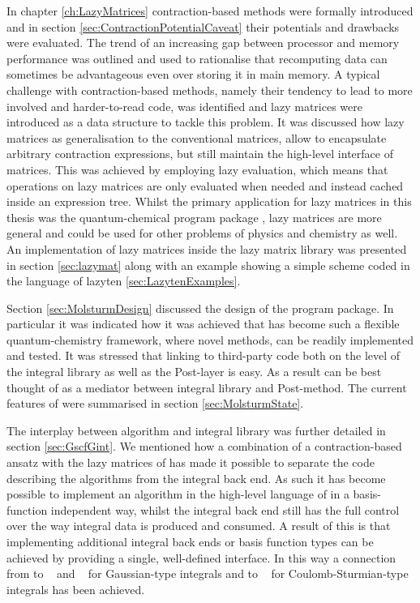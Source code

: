 In chapter \ref{ch:LazyMatrices} contraction-based methods
were formally introduced and in section \ref{sec:ContractionPotentialCaveat}
their potentials and drawbacks were evaluated.
The trend of an increasing gap between processor and memory performance
was outlined and used to rationalise that recomputing data
can sometimes be advantageous even over storing it in main memory.
A typical challenge with contraction-based methods,
namely their tendency to lead to more involved and harder-to-read code,
was identified
and lazy matrices were introduced as a data structure
to tackle this problem.
It was discussed how lazy matrices as generalisation
to the conventional matrices,
allow to encapsulate arbitrary contraction expressions,
but still maintain the high-level interface of matrices.
This was achieved by employing lazy evaluation,
which means that operations on lazy matrices are only
evaluated when needed
and instead cached inside an expression tree.
Whilst the primary application for lazy matrices in this thesis was the quantum-chemical
program package \molsturm,
lazy matrices are more general and could be used for other problems
of physics and chemistry as well.
An implementation of lazy matrices inside the
lazy matrix library \lazyten was presented in section \ref{sec:lazymat}
along with an example showing a simple \SCF
scheme coded in the language of lazyten \ref{sec:LazytenExamples}.


Section \ref{sec:MolsturmDesign} discussed
the design of the \molsturm program package.
In particular it was indicated how it was achieved
that \molsturm has become such a flexible quantum-chemistry framework,
where novel methods,
can be readily implemented and tested.
It was stressed that linking to third-party code
both on the level of the integral library as well
as the Post-\HF layer is easy.
As a result \molsturm can be best thought of as a mediator
between integral library and Post-\HF method.
The current features of \molsturm
were summarised in section \ref{sec:MolsturmState}.

The interplay between \SCF algorithm and integral library
was further detailed in section \ref{sec:GscfGint}.
We mentioned how a combination of a contraction-based \SCF ansatz
with the lazy matrices of \lazyten
has made it possible to separate the code describing
the \SCF algorithms from the integral back end.
As such it has become possible to implement
an \SCF algorithm in the high-level language of \lazyten
in a basis-function independent way,
whilst the integral back end still has the full
control over the way integral data is produced and consumed.
A result of this is that implementing
additional integral back ends or basis function types
can be achieved by providing a single,
well-defined interface.
In this way a connection from \molsturm
to \libint~\cite{Libint2_231,Libint2} and \libcint~\cite{Sun2015}
for Gaussian-type integrals
and to \sturmint~\cite{sturmintWeb}
for Coulomb-Sturmian-type integrals has been achieved.


